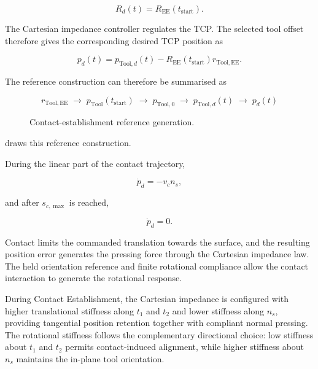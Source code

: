 \begin{equation}
R_d(t)=R_{\mathrm{EE}}(t_{\mathrm{start}}).
\label{eq:implementation_setup_orientation_reference}
\end{equation}

The Cartesian impedance controller regulates the TCP. The selected tool offset
therefore gives the corresponding desired TCP position as

\begin{equation}
p_d(t)
=
p_{\mathrm{Tool},d}(t)-R_{\mathrm{EE}}(t_{\mathrm{start}})r_{\mathrm{Tool,EE}}.
\label{eq:implementation_setup_tcp_reference}
\end{equation}

The reference construction can therefore be summarised as

\[
\boxed{
r_{\mathrm{Tool,EE}}
\;\rightarrow\;
p_{\mathrm{Tool}}(t_{\mathrm{start}})
\;\rightarrow\;
p_{\mathrm{Tool},0}
\;\rightarrow\;
p_{\mathrm{Tool},d}(t)
\;\rightarrow\;
p_d(t)
}
\]

\begin{figure}[H]
  \centering
  
  \caption{Contact-establishment reference generation.}
  \label{fig:setup_reference}
\end{figure}

\mbox{} draws this reference construction.

During the linear part of the contact trajectory,

\[
\dot p_d=-v_cn_s,
\]

and after \mbox{\(s_{c,\max}\)} is reached,

\[
\dot p_d=0.
\]

Contact limits the commanded translation towards the surface, and the resulting
position error generates the pressing force through the Cartesian impedance
law. The held orientation reference and finite rotational compliance allow the
contact interaction to generate the rotational response.

During Contact Establishment, the Cartesian impedance is configured with higher
translational stiffness along \mbox{\(t_1\)} and \mbox{\(t_2\)} and lower
stiffness along \mbox{\(n_s\)}, providing tangential position retention
together with compliant normal pressing. The rotational stiffness follows the
complementary directional choice: low stiffness about \mbox{\(t_1\)} and
\mbox{\(t_2\)} permits contact-induced alignment, while higher stiffness about
\mbox{\(n_s\)} maintains the in-plane tool orientation.

